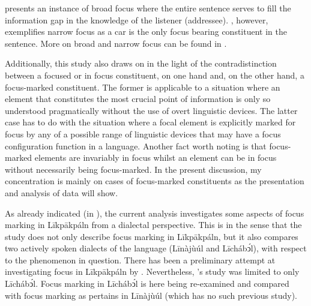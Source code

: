 \documentclass[output=paper,colorlinks,citecolor=brown]{langscibook}
\begin{document}
 presents an instance of broad focus where the entire sentence serves to fill the information gap in the knowledge of the listener (addressee). , however, exemplifies narrow focus as a car is the only focus bearing constituent in the sentence. More on broad and narrow focus can be found in \citet[96--97]{Hyman2010}.

Additionally, this study also draws on \citet[93]{VanPutten2016} in the light of the contradistinction between a focused or in focus constituent, on one hand and, on the other hand, a focus-marked constituent. The former is applicable to a situation where an element that constitutes the most crucial point of information is only so understood pragmatically without the use of overt linguistic devices. The latter case has to do with the situation where a focal element is explicitly marked for focus by any of a possible range of linguistic devices that may have a focus configuration function in a language. Another fact worth noting is that focus-marked elements are invariably in focus whilst an element can be in focus without necessarily being focus-marked. In the present discussion, my concentration is mainly on cases of focus-marked constituents as the presentation and analysis of data will show.

As already indicated (in ), the current analysis investigates some aspects of focus marking in Līkpākpáln from a dialectal perspective. This is in the sense that the study does not only describe focus marking in Līkpākpáln, but it also compares two actively spoken dialects of the language (Līnàjùúl and Līchábͻ́l), with respect to the phenomenon in question. There has been a preliminary attempt at investigating focus in Līkpākpáln by \citet{Schwarz2009}. Nevertheless, \citeauthor{Schwarz2009}’s study was limited to only Līchábͻ́l. Focus marking in Līchábͻ́l is here being re-examined and compared with focus marking as pertains in Līnàjùúl (which has no such previous study).
\end{document}
